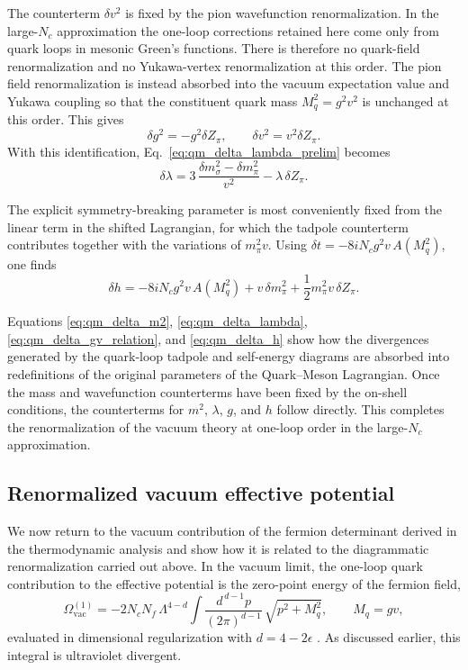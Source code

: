 The counterterm \(\delta v^2\) is fixed by the pion wavefunction
renormalization. In the large-\(N_c\) approximation the one-loop
corrections retained here come only from quark loops in mesonic
Green's functions. There is therefore no quark-field renormalization
and no Yukawa-vertex renormalization at this order. The pion field
renormalization is instead absorbed into the vacuum expectation value
and Yukawa coupling so that the constituent quark mass
\(M_q^2=g^2v^2\) is unchanged at this order. This gives
\begin{equation}
\delta g^2 = - g^2 \delta Z_\pi ,
\qquad
\delta v^2 = v^2 \delta Z_\pi .
\label{eq:qm_delta_gv_relation}
\end{equation}
With this identification, Eq.~\eqref{eq:qm_delta_lambda_prelim}
becomes
\begin{equation}
\delta\lambda
=
3\,\frac{\delta m_\sigma^2-\delta m_\pi^2}{v^2}
-
\lambda\,\delta Z_\pi .
\label{eq:qm_delta_lambda}
\end{equation}

The explicit symmetry-breaking parameter is most conveniently fixed
from the linear term in the shifted Lagrangian, for which the tadpole
counterterm contributes together with the variations of
\(m_\pi^2 v\). Using \(\delta t=-8 i N_c g^2 v\,A(M_q^2)\), one finds
\begin{equation}
\delta h
=
-8 i N_c g^2 v\,A(M_q^2)
+
v\,\delta m_\pi^2
+
\frac{1}{2}m_\pi^2 v\,\delta Z_\pi .
\label{eq:qm_delta_h}
\end{equation}

Equations
\eqref{eq:qm_delta_m2},
\eqref{eq:qm_delta_lambda},
\eqref{eq:qm_delta_gv_relation}, and
\eqref{eq:qm_delta_h}
show how the divergences generated by the quark-loop tadpole and
self-energy diagrams are absorbed into redefinitions of the original
parameters of the Quark--Meson Lagrangian. Once the mass and
wavefunction counterterms have been fixed by the on-shell conditions,
the counterterms for \(m^2\), \(\lambda\), \(g\), and \(h\) follow
directly. This completes the renormalization of the vacuum theory at
one-loop order in the large-\(N_c\) approximation.

\subsection{Renormalized vacuum effective potential}

We now return to the vacuum contribution of the fermion determinant
derived in the thermodynamic analysis and show how it is related to
the diagrammatic renormalization carried out above. In the vacuum
limit, the one-loop quark contribution to the effective potential is
the zero-point energy of the fermion field,
\begin{equation}
\Omega_{\mathrm{vac}}^{(1)}
=
-2N_cN_f\,\Lambda^{4-d}
\int\frac{d^{\,d-1}p}{(2\pi)^{d-1}}\,
\sqrt{p^2+M_q^2},
\qquad
M_q = gv ,
\label{eq:qm_Omega_vac_start}
\end{equation}
evaluated in dimensional regularization with \(d=4-2\epsilon\)
\cite{Folkestad2018,Andersen2024}. As discussed earlier, this
integral is ultraviolet divergent.

